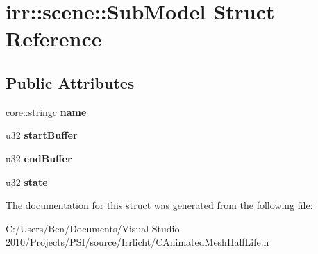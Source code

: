 \hypertarget{structirr_1_1scene_1_1_sub_model}{\section{irr\-:\-:scene\-:\-:Sub\-Model Struct Reference}
\label{structirr_1_1scene_1_1_sub_model}
}
\subsection*{Public Attributes}
\begin{DoxyCompactItemize}
\item 
\hypertarget{structirr_1_1scene_1_1_sub_model_abaad693a2a500f3153bc6b376da20586}{core\-::stringc {\bfseries name}}\label{structirr_1_1scene_1_1_sub_model_abaad693a2a500f3153bc6b376da20586}

\item 
\hypertarget{structirr_1_1scene_1_1_sub_model_a5985bb53b65f1cbae6483f5cdeb0aa8b}{u32 {\bfseries start\-Buffer}}\label{structirr_1_1scene_1_1_sub_model_a5985bb53b65f1cbae6483f5cdeb0aa8b}

\item 
\hypertarget{structirr_1_1scene_1_1_sub_model_a3c888c376bd258927c1ae8a2de025047}{u32 {\bfseries end\-Buffer}}\label{structirr_1_1scene_1_1_sub_model_a3c888c376bd258927c1ae8a2de025047}

\item 
\hypertarget{structirr_1_1scene_1_1_sub_model_a90167249afa307b36fde30ee1c176bd0}{u32 {\bfseries state}}\label{structirr_1_1scene_1_1_sub_model_a90167249afa307b36fde30ee1c176bd0}

\end{DoxyCompactItemize}


The documentation for this struct was generated from the following file\-:\begin{DoxyCompactItemize}
\item 
C\-:/\-Users/\-Ben/\-Documents/\-Visual Studio 2010/\-Projects/\-P\-S\-I/source/\-Irrlicht/C\-Animated\-Mesh\-Half\-Life.\-h\end{DoxyCompactItemize}
